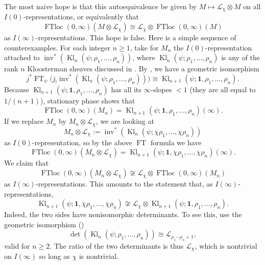 The most naive hope is that this autoequivalence be given by
\(M\mapsto\mathcal{L}_{\chi}\otimes M\) on all \(I(0)\)-representations, or
equivalently that
\[
  \operatorname{FTloc}(0,\infty)(M\otimes\mathcal{L}_{\chi})
  \cong
  \mathcal{L}_{\overline{\chi}}\otimes
  \operatorname{FTloc}(0,\infty)(M)
\]
as \(I(\infty)\)-representations. This hope is false. Here is a simple
sequence of counterexamples. For each integer \(n\geq1\), take for \(M_n\) the
\(I(0)\)-representation attached to
\(\operatorname{inv}^*(\operatorname{Kl}_n(\psi;\rho_1,\ldots,\rho_n))\),
where \(\operatorname{Kl}_n(\psi;\rho_1,\ldots,\rho_n)\) is any of the rank
\(n\) Kloosterman sheaves discussed in \cite[7.4.1]{Ka-GKM}. By
\cite[8.6.1]{Ka-GKM}, we have a geometric isomorphism
\[
  j^*\operatorname{FT}_{\psi}
  \bigl(j_!\operatorname{inv}^*
  (\operatorname{Kl}_n(\psi;\rho_1,\ldots,\rho_n))\bigr)
  \cong
  \operatorname{Kl}_{n+1}(\psi;\mathbf{1},\rho_1,\ldots,\rho_n).
\]
Because \(\operatorname{Kl}_{n+1}(\psi;\mathbf{1},\rho_1,\ldots,\rho_n)\) has
all its \(\infty\)-slopes \(<1\) (they are all equal to \(1/(n+1)\)),
stationary phase shows that
\[
  \operatorname{FTloc}(0,\infty)(M_n)
  =
  \operatorname{Kl}_{n+1}(\psi;\mathbf{1},\rho_1,\ldots,\rho_n)(\infty).
\]
If we replace \(M_n\) by \(M_n\otimes\mathcal{L}_{\chi}\), we are looking at
\[
  M_n\otimes\mathcal{L}_{\chi}
  :=
  \operatorname{inv}^*
  (\operatorname{Kl}_n(\psi;\overline{\chi}\rho_1,\ldots,
  \overline{\chi}\rho_n))
\]
as \(I(0)\)-representation, so by the above \(\operatorname{FT}\) formula we
have
\[
  \operatorname{FTloc}(0,\infty)(M_n\otimes\mathcal{L}_{\chi})
  =
  \operatorname{Kl}_{n+1}(\psi;\mathbf{1},\overline{\chi}\rho_1,\ldots,
  \overline{\chi}\rho_n)(\infty).
\]
We claim that
\[
  \operatorname{FTloc}(0,\infty)(M_n\otimes\mathcal{L}_{\chi})
  \not\cong
  \mathcal{L}_{\overline{\chi}}\otimes
  \operatorname{FTloc}(0,\infty)(M_n)
\]
as \(I(\infty)\)-representations. This amounts to the statement that, as
\(I(\infty)\)-representations,
\[
  \operatorname{Kl}_{n+1}(\psi;\mathbf{1},\overline{\chi}\rho_1,\ldots,
  \overline{\chi}\rho_n)
  \not\cong
  \mathcal{L}_{\overline{\chi}}\otimes
  \operatorname{Kl}_{n+1}(\psi;\mathbf{1},\rho_1,\ldots,\rho_n).
\]
Indeed, the two sides have nonisomorphic determinants. To see this, use the
geometric isomorphism (\cite[7.4.1]{Ka-GKM})
\[
  \det(\operatorname{Kl}_n(\psi;\rho_1,\ldots,\rho_n))
  \cong
  \mathcal{L}_{\rho_1\cdots\rho_n+1},
\]
valid for \(n\geq2\). The ratio of the two determinants is thus
\(\mathcal{L}_{\chi}\), which is nontrivial on \(I(\infty)\) so long as
\(\chi\) is nontrivial.

